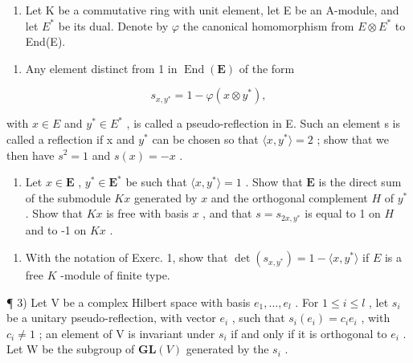 
\begin{enumerate}
\def\labelenumi{\arabic{enumi})}
\tightlist
\item
  Let K be a commutative ring with unit element, let E be an A-module, and let \(E^{*}\) be its dual. Denote by \(\varphi\) the canonical homomorphism from \(E \otimes E^{*}\) to End(E).
\end{enumerate}

\begin{enumerate}
\def\labelenumi{\alph{enumi})}
\tightlist
\item
  Any element distinct from 1 in \(\operatorname{End}(\mathbf{E})\) of the form
\end{enumerate}

\[
s _ {x, y ^ {*}} = 1 - \varphi (x \otimes y ^ {*}),
\]

with \(x \in E\) and \(y^{*} \in E^{*}\) , is called a pseudo-reflection in E. Such an element s is called a reflection if x and \(y^{*}\) can be chosen so that \(\langle x, y^{*} \rangle = 2\) ; show that we then have \(s^{2} = 1\) and \(s(x) = -x\) .

\begin{enumerate}
\def\labelenumi{\alph{enumi})}
\setcounter{enumi}{1}
\tightlist
\item
  Let \(x \in \mathbf{E}\) , \(y^{*} \in \mathbf{E}^{*}\) be such that \(\langle x, y^{*} \rangle = 1\) . Show that \(\mathbf{E}\) is the direct sum of the submodule \(Kx\) generated by \(x\) and the orthogonal complement \(H\) of \(y^{*}\) . Show that \(Kx\) is free with basis \(x\) , and that \(s = s_{2x,y^*}\) is equal to 1 on \(H\) and to -1 on \(Kx\) .
\end{enumerate}

\begin{enumerate}
\def\labelenumi{\arabic{enumi})}
\setcounter{enumi}{1}
\tightlist
\item
  With the notation of Exerc. 1, show that \(\det(s_{x,y^*}) = 1 - \langle x, y^* \rangle\) if \(E\) is a free \(K\) -module of finite type.
\end{enumerate}

¶ 3) Let V be a complex Hilbert space with basis \(e_1, \ldots, e_l\) . For \(1 \leqslant i \leqslant l\) , let \(s_i\) be a unitary pseudo-reflection, with vector \(e_i\) , such that \(s_i(e_i) = c_i e_i\) , with \(c_i \neq 1\) ; an element of V is invariant under \(s_i\) if and only if it is orthogonal to \(e_i\) . Let W be the subgroup of \(\mathbf{GL}(V)\) generated by the \(s_i\) .

